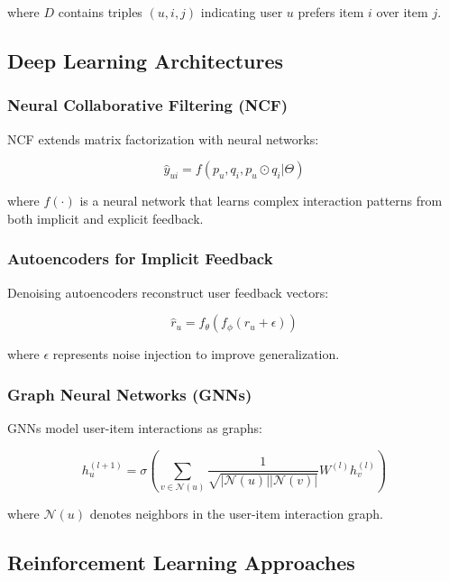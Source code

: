 where $D$ contains triples $(u,i,j)$ indicating user $u$ prefers item $i$ over item $j$.

\subsection{Deep Learning Architectures}

\subsubsection{Neural Collaborative Filtering (NCF)}

NCF extends matrix factorization with neural networks:

\begin{equation}
\hat{y}_{ui} = f(p_u, q_i, p_u \odot q_i | \Theta)
\label{eq:ncf}
\end{equation}

where $f(\cdot)$ is a neural network that learns complex interaction patterns from both implicit and explicit feedback.

\subsubsection{Autoencoders for Implicit Feedback}

Denoising autoencoders reconstruct user feedback vectors:

\begin{equation}
\hat{r}_u = f_\theta(f_\phi(r_u + \epsilon))
\label{eq:autoencoder}
\end{equation}

where $\epsilon$ represents noise injection to improve generalization.

\subsubsection{Graph Neural Networks (GNNs)}

GNNs model user-item interactions as graphs:

\begin{equation}
h_u^{(l+1)} = \sigma\left(\sum_{v \in \mathcal{N}(u)} \frac{1}{\sqrt{|\mathcal{N}(u)||\mathcal{N}(v)|}} W^{(l)} h_v^{(l)}\right)
\label{eq:gnn}
\end{equation}

where $\mathcal{N}(u)$ denotes neighbors in the user-item interaction graph.

\subsection{Reinforcement Learning Approaches}


